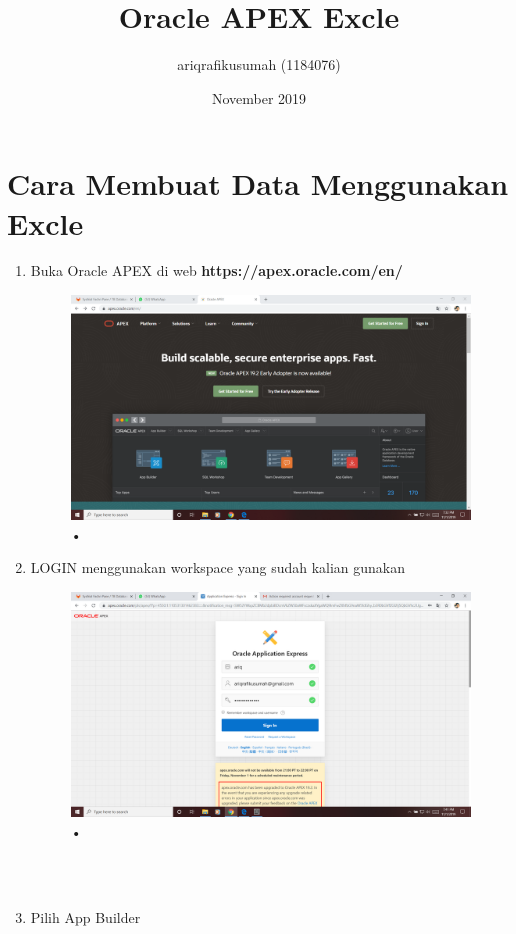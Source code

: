 \documentclass[12pt, times new roman, a4paper]{article}
\title{Oracle APEX Excle}
\author{ariqrafikusumah (1184076)}
\date{November 2019}
\begin{document}
\maketitle

\section{Cara Membuat Data Menggunakan Excle}
\begin{enumerate}
\item Buka Oracle APEX di web \textbf{https://apex.oracle.com/en/}
\begin{figure}[h]
	\centering
		\includegraphics[scale=0.2]{Gambar/Capture1}
	\caption{•}
\end{figure}
\item LOGIN menggunakan workspace yang sudah kalian gunakan
\begin{figure}[h]
	\centering
		\includegraphics[scale=0.2]{Gambar/Capture2}
	\caption{•}
\end{figure}
\\
\\
\item Pilih App Builder

\end{enumerate}
\end{document}
